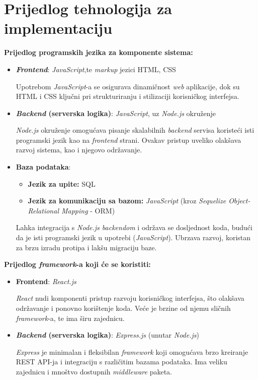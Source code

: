 \section{Prijedlog tehnologija za implementaciju} \label{prijedlogTehnologijaZaImplementaciju}


\textbf{Prijedlog programskih jezika za komponente sistema:}
\begin{itemize}  
    \item \textbf{\textit{Frontend}}: \textit{JavaScript},te \textit{markup} jezici HTML, CSS

    
    Upotrebom \textit{JavaScript}-a se osigurava dinamičnost \textit{web} aplikacije, dok su HTML i CSS ključni pri strukturiranju i stilizaciji korisničkog interfejsa.
    \item \textbf{\textit{Backend} (serverska logika)}:  \textit{JavaScript}, uz\textit{ Node.js} okruženje

    
    \textit{Node.js} okruženje omogućava pisanje skalabilnih \textit{backend} servisa koristeći isti programski jezik kao na \textit{frontend} strani. Ovakav pristup uveliko olakšava razvoj sistema, kao i njegovo održavanje. 
    \item \textbf{Baza podataka}: \begin{itemize}
        \item \textbf{Jezik za upite:} SQL
        \item \textbf{Jezik za komunikaciju sa bazom:} \textit{JavaScript} (kroz \textit{Sequelize Object-Relational Mapping} - ORM)
    \end{itemize}
    Lahka integracija s \textit{Node.js backendom} i održava se dosljednost koda, budući da je isti programski jezik u upotrebi (\textit{JavaScript}). Ubrzava razvoj, koristan za brzu izradu protipa i lakšu migraciju baze.
\end{itemize} 
\textbf{Prijedlog \textit{framework}-a koji će se koristiti:}
\begin{itemize}  
    \item \textbf{Frontend}: \textit{React.js}

    
    \textit{React} nudi komponenti pristup razvoju korisničkog interfejsa, što olakšava održavanje i ponovno korištenje koda. Veće je brzine od njemu sličnih \textit{framework}-a, te ima širu zajednicu.
    \item \textbf{\textit{Backend} (serverska logika)}: \textit{Express.js} (unutar \textit{Node.js})

    
    \textit{Express} je minimalan i fleksibilan \textit{framework} koji omogućava brzo kreiranje REST API-ja i integraciju s različitim bazama podataka. Ima veliku zajednicu i mnoštvo dostupnih \textit{middleware} paketa.
\end{itemize} 
